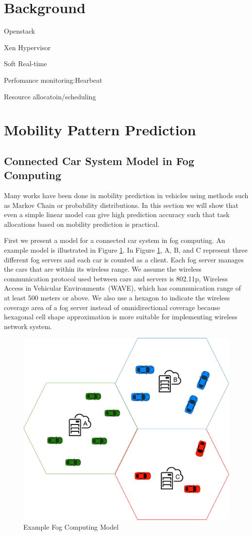 \section{Background}

Openstack

Xen Hypervisor

Soft Real-time

Perfomance monitoring:Hearbeat

Resource allocatoin/scheduling


\iffalse

\section{Mobility Pattern Prediction}
\label{s2}

\subsection{Connected Car System Model in Fog Computing}


Many works have been done in mobility prediction in vehicles using methods such as Markov Chain\cite{sf} or probability distributions\cite{rome}. In this section we will show that even a simple linear model can give high prediction accuracy such that task allocations based on mobility prediction is practical.

First we present a model for a connected car system in fog computing. An example model is illustrated in Figure \ref{carrep}. In Figure \ref{carrep}, A, B, and C represent three different fog servers and each car is counted as a client. Each fog server manages the cars that are within its wireless range. We assume the wireless communication protocol used between cars and servers is 802.11p, Wireless Access in Vehicular Environments (WAVE)\cite{wave}, which has communication range of at least 500 meters or above\cite{waver}. We also use a hexagon to indicate the wireless coverage area of a fog server instead of omnidirectional coverage because hexagonal cell shape approximation is more suitable for implementing wireless network system\cite{hex}. 

\begin{figure}[h!]
\centering
\includegraphics[width=0.75\linewidth]{images/car_rep}
\caption{Example Fog Computing Model}
\label{carrep}
\end{figure}



